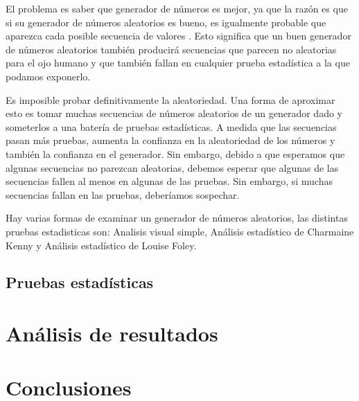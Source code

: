 El problema es saber que generador de números es mejor, ya que la razón es que si su generador de números aleatorios es bueno, es igualmente probable que aparezca cada posible secuencia de valores . Esto significa que un buen generador de números aleatorios también producirá secuencias que parecen no aleatorias para el ojo humano y que también fallan en cualquier prueba estadística a la que podamos exponerlo. 


Es imposible probar definitivamente la aleatoriedad. Una forma de aproximar esto es tomar muchas secuencias de números aleatorios de un generador dado y someterlos a una batería de pruebas estadísticas. A medida que las secuencias pasan más pruebas, aumenta la confianza en la aleatoriedad de los números y también la confianza en el generador. Sin embargo, debido a que esperamos que algunas secuencias no parezcan aleatorias, debemos esperar que algunas de las secuencias fallen al menos en algunas de las pruebas. Sin embargo, si muchas secuencias fallan en las pruebas, deberíamos sospechar.

Hay varias formas de examinar un generador de números aleatorios, las distintas pruebas estadisticas son: Analisis visual simple, Análisis estadístico de Charmaine Kenny y Análisis estadístico de Louise Foley.
 
\subsection{Pruebas estadísticas}




\section{Análisis de resultados}


\section{Conclusiones}
